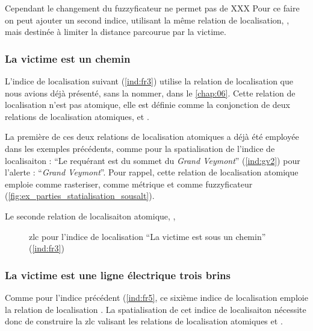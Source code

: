 Cependant le changement du fuzzyficateur ne permet pas de XXX
%
Pour ce faire on peut ajouter un second indice, utilisant la même
relation de localisation, , mais
destinée à limiter la distance parcourue par la victime.
%


\subsubsection{La victime est \protect{} un chemin}

L'indice de localisation suivant (\ref{ind:fr3}) utilise la relation
de localisation  que nous avions déjà
présenté, sans la nommer, dans le \autoref{chap:06}. Cette relation de
localisation n'est pas atomique, elle est définie comme la conjonction
de deux relations de localisation atomiques,
 et .

La première de ces deux relations de localisation atomiques
 a déjà été employée dans les exemples
précédents, comme pour la spatialisation de l'indice de localisaiton :
\enquote{Le requérant est  du sommet du
  \emph{Grand Veymont}} (\ref{ind:gv2}) pour l'alerte :
\enquote{\emph{Grand Veymont}}. Pour rappel, cette relation de
localisation atomique emploie  comme rasteriser,
 comme métrique et
 comme fuzzyficateur
(\autoref{fig:ex_parties_statialisation_sousalt}).

Le seconde relation de localisaiton atomique, ,


\begin{figure}
  \centering
  
  \caption{\ac{zlc} pour l'indice de localisation \enquote{La victime
      est sous un chemin} (\ref{ind:fr3})}
\end{figure}

\subsubsection{La victime est \protect{} une ligne
  électrique trois brins}

Comme pour l'indice précédent (\ref{ind:fr5}, ce sixième indice de
localisation emploie la relation de localisation
.
%
La spatialisation de cet indice de localisaiton nécessite donc de
construire la \ac{zlc} valisant les relations de localisation
atomiques  et .

